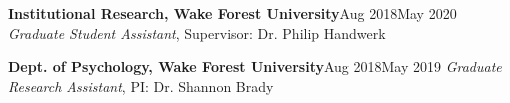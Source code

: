 {%







\entrybig
	{\textbf{Institutional Research, Wake Forest University}}{Aug 2018\textendash May 2020}
	{\textit{Graduate Student Assistant}, Supervisor: Dr. Philip Handwerk}{} %
   

\entrybig
	{\textbf{Dept. of Psychology, Wake Forest University}}{Aug 2018\textendash May 2019}
	{\textit{Graduate Research Assistant}, PI: Dr. Shannon Brady}{} %
  
}
